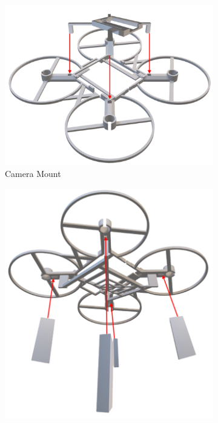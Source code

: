 \begin{figure}[H]
    \centering
    \begin{subfigure}[b]{0.45\textwidth}
        \centering
        \includegraphics[width=\textwidth]{img/assembly-6.png}
        \caption{Camera Mount}
    \end{subfigure}
    \begin{subfigure}[b]{0.35\textwidth}
        \centering
        \includegraphics[width=\textwidth]{img/assembly-7.png}

\end{subfigure}
\end{figure}
